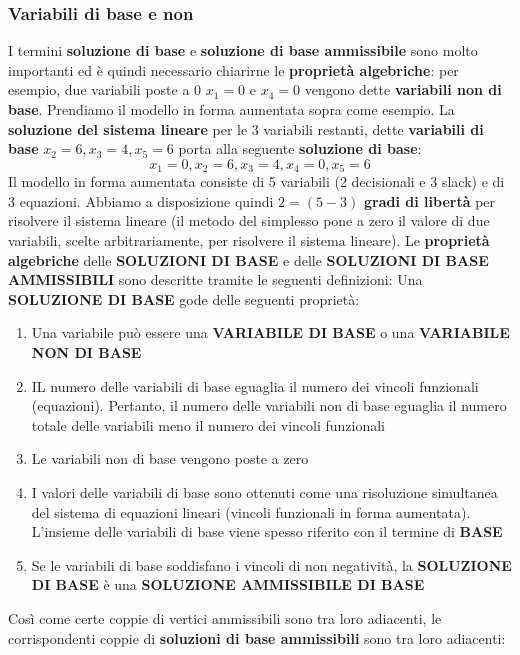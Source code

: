 \documentclass[12pt]{article}
\begin{document}
\subsubsection{Variabili di base e non}
I termini \textbf{soluzione di base} e \textbf{soluzione di base ammissibile} sono molto importanti ed è quindi necessario chiarirne le \textbf{proprietà algebriche}:
per esempio, due variabili poste a 0 $x_1 = 0$ e $x_4 = 0$ vengono dette \textbf{variabili non di base}. Prendiamo il modello in forma aumentata sopra come esempio.
La \textbf{soluzione del sistema lineare} per le 3 variabili restanti, dette \textbf{variabili di base} $x_2 = 6, x_3 = 4, x_5 = 6$ porta alla seguente \textbf{soluzione di base}:
$$x_1 = 0, x_2 = 6, x_3 = 4, x_4 = 0, x_5 = 6$$
Il modello in forma aumentata consiste di 5 variabili (2 decisionali e 3 slack) e di 3 equazioni.
Abbiamo a disposizione quindi $2 = (5-3)$ \textbf{gradi di libertà} per risolvere il sistema lineare (il metodo del simplesso pone a zero il valore di due variabili, scelte arbitrariamente, per risolvere il sistema lineare). \newline
Le \textbf{proprietà algebriche} delle \textbf{SOLUZIONI DI BASE} e delle \textbf{SOLUZIONI DI BASE AMMISSIBILI} sono descritte tramite le seguenti definizioni: \newline
Una \textbf{SOLUZIONE DI BASE} gode delle seguenti proprietà:
\begin{enumerate}
    \item Una variabile può essere una \textbf{VARIABILE DI BASE} o una \textbf{VARIABILE NON DI BASE}
    \item IL numero delle variabili di base eguaglia il numero dei vincoli funzionali (equazioni). Pertanto, il numero delle variabili non di base eguaglia il numero totale delle variabili meno il numero dei vincoli funzionali
    \item Le variabili non di base vengono poste a zero
    \item I valori delle variabili di base sono ottenuti come una risoluzione simultanea del sistema di equazioni lineari (vincoli funzionali in forma aumentata). L'insieme delle variabili di base viene spesso riferito con il termine di \textbf{BASE}
    \item Se le variabili di base soddisfano i vincoli di non negatività, la \textbf{SOLUZIONE DI BASE} è una \textbf{SOLUZIONE AMMISSIBILE DI BASE}
\end{enumerate}
Così come certe coppie di vertici ammissibili sono tra loro adiacenti, le corrispondenti coppie di \textbf{soluzioni di base ammissibili} sono tra loro adiacenti: \newline
\end{document}
